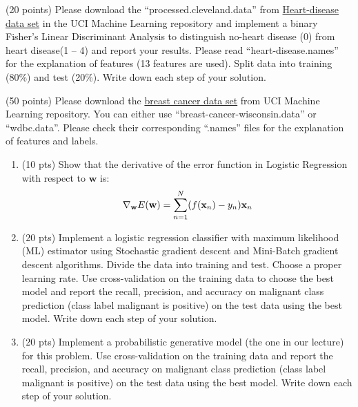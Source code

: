 \documentclass{exam}
\newcommand{\xx}{{\bf{x}}}
\newcommand{\ww}{{\bf{w}}}
\begin{document}
\begin{questions}

 (20 points) Please download the ``processed.cleveland.data'' from \href{https://archive.ics.uci.edu/ml/machine-learning-databases/heart-disease/}{Heart-disease data set} in the UCI Machine Learning repository and implement a binary Fisher's Linear Discriminant Analysis to distinguish no-heart disease (0) from heart disease(1 -- 4) and report your results.  Please read ``heart-disease.names'' for the explanation of features (13 features are used). Split data into training (80\%) and test (20\%). Write down each step of your solution. 
\vspace{5em}
 
  (50 points) Please download the \href{https://archive.ics.uci.edu/ml/datasets/Breast+Cancer+Wisconsin+\%28Diagnostic\%29}{breast cancer data set} from UCI Machine Learning repository. You can either use ``breast-cancer-wisconsin.data'' or ``wdbc.data''. Please check their corresponding ``.names'' files for the explanation of features and labels.

\begin{enumerate}
\item (10 pts) Show that the derivative of the error function in Logistic Regression with respect to $\mathbf{w}$ is:
\begin{equation*}
\nabla_\ww E(\ww)=\sum_{n=1}^{N}(f(\xx_n)-y_n)\xx_n 
\end{equation*}

\item (20 pts) Implement a logistic regression classifier with maximum likelihood (ML) estimator using Stochastic gradient descent and Mini-Batch gradient descent algorithms. Divide the data into training and test. Choose a proper learning rate. Use cross-validation on the training data to choose the best model and report the recall, precision, and accuracy on malignant class prediction (class label malignant is positive) on the test data using the best model. Write down each step of your solution.

\item (20 pts) Implement a probabilistic generative model (the one in our lecture) for this problem. Use cross-validation on the training data and report the recall, precision, and accuracy on malignant class prediction (class label malignant is positive)  on the test data using the best model. Write down each step of your solution.
\end{enumerate}
\vspace{5em}


\end{questions}
\end{document}
